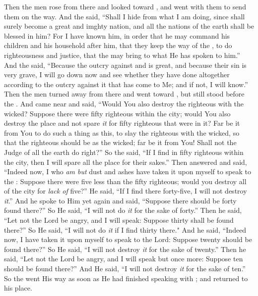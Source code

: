 
\bverse Then the men rose from there and looked toward , and \Abraham went with them to send them on the way.
\bverse And the \lord said, ``Shall I hide from \Abraham what I am doing,
\bverse since \Abraham shall surely become a great and imghty nation, and all the nations of the earth shall be blessed in him?
\bverse For I have known him, in order that he may command his children and his household after him, that they keep the way of the \lord, to do righteousness and justice, that the \lord may bring to \Abraham what He has spoken to him.''
\bverse And the \lord said, ``Because the outcry against  and  is great, and because their sin is very grave,
\bverse I will go down now and see whether they have done altogether according to the outcry against it that has come to Me; and if not, I will know.''
\bverse Then the men turned away from there and went toward , but \Abraham still stood before the \lord.
\bverse And \Abraham came near and said, ``Would You also destroy the righteous with the wicked?
\bverse Suppose there were fifty righteous within the city; would You also destroy the place and not spare \textit{it} for fifty righteous that were in it?
\bverse Far be it from You to do such a thing as this, to slay the righteous with the wicked, so that the righteous should be as the wicked; far be it from You! Shall not the Judge of all the earth do right?''
\bverse So the \lord said, ``If I find in  fifty righteous within the city, then I will spare all the place for their sakes.''
\bverse Then \Abraham answered and said, ``Indeed now, I who \textit{am but} dust and ashes have taken it upon myself to speak to the \lord:
\bverse Suppose there were five less than the fifty righteous; would you destroy all of the city for \textit{lack of} five?'' He said, ``If I find there forty-five, I will not destroy \textit{it}.''
\bverse And he spoke to Him yet again and said, ``Suppose there should be forty found there?'' So He said, ``I will not do \textit{it} for the sake of forty.''
\bverse Then he said, ``Let not the Lord be angry, and I will speak: Suppose thirty shall be found there?'' So He said, ``I will not do \textit{it} if I find thirty there."
\bverse And he said, ``Indeed now, I have taken it upon myself to speak to the Lord: Suppose twenty should be found there?'' So He said, ``I will not destroy \textit{it} for the sake of twenty.''
\bverse Then he said, ``Let not the Lord be angry, and I will speak but once more: Suppose ten should be found there?'' And He said, ``I will not destroy \textit{it} for the sake of ten.''
\bverse So the \lord went His way as soon as He had finished speaking with \Abraham; and \Abraham returned to his place.
